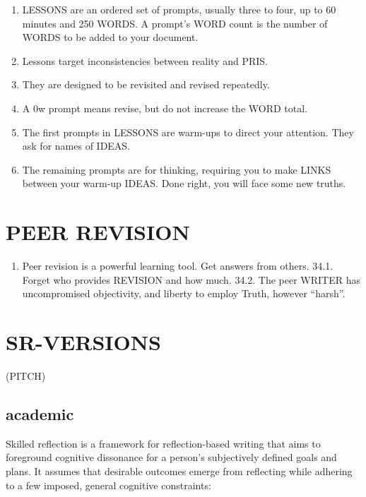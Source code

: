 \documentclass[
]{book}
\providecommand{\tightlist}{%
  \setlength{\itemsep}{0pt}\setlength{\parskip}{0pt}}
\begin{document}
\begin{enumerate}
\def\labelenumi{\arabic{enumi}.}
\setcounter{enumi}{18}
\tightlist
\item
  LESSONS are an ordered set of prompts, usually three to four, up to 60 minutes and 250 WORDS.
  A prompt's WORD count is the number of
  WORDS to be added to your document.
\item
  Lessons target inconsistencies between reality and PRIS.
\item
  They are designed to be revisited and revised repeatedly.
\item
  A 0w prompt means revise, but do not increase the WORD total.
\item
  The first prompts in LESSONS are warm-ups to direct your attention.
  They ask for names of IDEAS.
\item
  The remaining prompts are for thinking, requiring you to make LINKS
  between your warm-up IDEAS. Done right, you will face some new
  truths.
\end{enumerate}

\hypertarget{peer-revision}{%
\section{PEER REVISION}\label{peer-revision}}

\begin{enumerate}
\def\labelenumi{\arabic{enumi}.}
\setcounter{enumi}{33}
\tightlist
\item
  Peer revision is a powerful learning tool. Get answers from others.
  34.1. Forget who provides REVISION and how much.
  34.2. The peer WRITER has uncompromised objectivity, and liberty to
  employ Truth, however ``harsh''.
\end{enumerate}

\hypertarget{sr-versions}{%
\section{SR-VERSIONS}\label{sr-versions}}

(PITCH)

\hypertarget{academic}{%
\subsection{academic}\label{academic}}

Skilled reflection is a framework for reflection-based writing that aims to foreground cognitive dissonance for a person's subjectively defined goals and plans. It assumes that desirable outcomes emerge from reflecting while adhering to a few imposed, general cognitive constraints:
\end{document}
